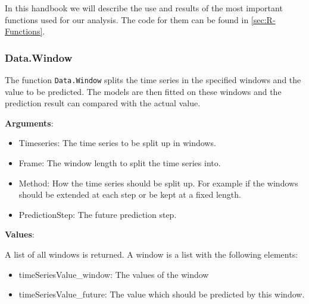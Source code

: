 In this handbook we will describe the use and results of the most important functions used for our analysis.  The code for them can be found in \ref{sec:R-Functions}. 

\subsubsection{Data.Window}
\label{sec: Data.Window}

The function \texttt{Data.Window} splits the time series in the specified windows and the value to be predicted. The models are then fitted on these windows and the prediction result can compared with the actual value.

\textbf{Arguments}:

\begin{itemize}
	\item Timeseries: The time series to be split up in windows.
	\item Frame: The window length to split the time series into.
	\item Method: How the time series should be split up. For example if the windows should be extended at each step or be kept at a fixed length.
	\item PredictionStep: The future prediction step.
\end{itemize}

\textbf{Values}:

A list of all windows is returned. A window is a list with the following elements: 

\begin{itemize}
	\item timeSeriesValue\_window: The values of the window
	\item timeSeriesValue\_future: The value which should be predicted by this window. 
\end{itemize}

